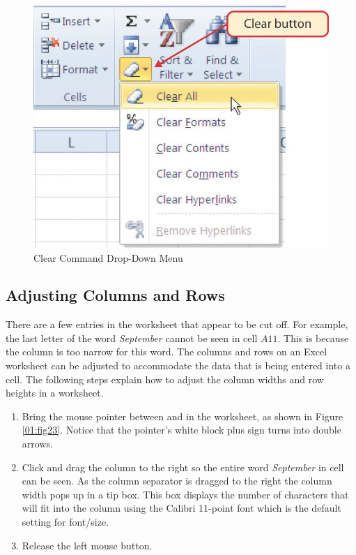 \begin{figure}[H]
	\centering
	\includegraphics[width=\maxwidth{.95\linewidth}]{gfx/ch01_fig22}
	\caption{Clear Command Drop-Down Menu}
	\label{01:fig22}
\end{figure}

\subsection{Adjusting Columns and Rows}

There are a few entries in the worksheet that appear to be cut off. For example, the last letter of the word \textit{September} cannot be seen in cell $ A11 $. This is because the column is too narrow for this word. The columns and rows on an Excel worksheet can be adjusted to accommodate the data that is being entered into a cell. The following steps explain how to adjust the column widths and row heights in a worksheet.

\begin{enumerate}
	\item Bring the mouse pointer between  and  in the  worksheet, as shown in Figure \ref{01:fig23}. Notice that the pointer's white block plus sign turns into double arrows.
	\item Click and drag the column to the right so the entire word \textit{September} in cell  can be seen. As the column separator is dragged to the right the column width pops up in a tip box. This box displays the number of characters that will fit into the column using the Calibri 11-point font which is the default setting for font/size.
	\item Release the left mouse button.
\end{enumerate}

